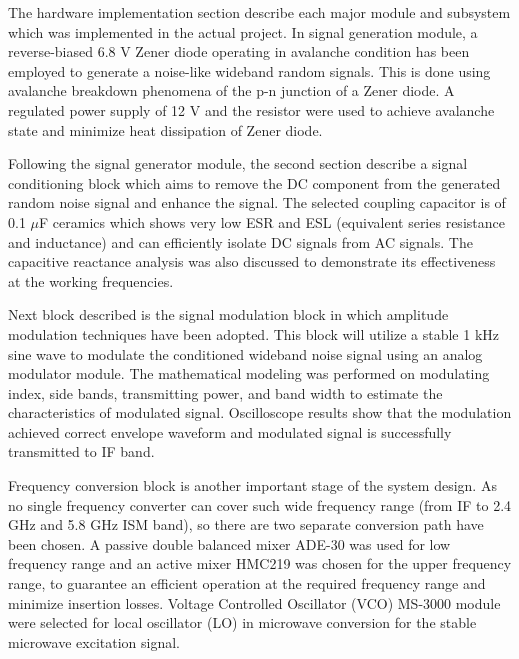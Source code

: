 \documentclass[12pt,a4paper]{report}
\begin{document}
	The hardware implementation section describe each major module and subsystem which was implemented in the actual project. In signal generation module, a reverse-biased 6.8 V Zener diode operating in avalanche condition has been employed to generate a noise-like wideband random signals. This is done using avalanche breakdown phenomena of the p-n junction of a Zener diode. A regulated power supply of 12 V and the resistor were used to achieve avalanche state and minimize heat dissipation of Zener diode.
	
	\vspace{0.5\baselineskip}
	
	Following the signal generator module, the second section describe a signal conditioning block which aims to remove the DC component from the generated random noise signal and enhance the signal. The selected coupling capacitor is of 0.1 $\mu$F ceramics which shows very low ESR and ESL (equivalent series resistance and inductance) and can efficiently isolate DC signals from AC signals. The capacitive reactance analysis was also discussed to demonstrate its effectiveness at the working frequencies.
	
	\vspace{0.5\baselineskip}
	
	Next block described is the signal modulation block in which amplitude modulation techniques have been adopted. This block will utilize a stable 1 kHz sine wave to modulate the conditioned wideband noise signal using an analog modulator module. The mathematical modeling was performed on modulating index, side bands, transmitting power, and band width to estimate the characteristics of modulated signal. Oscilloscope results show that the modulation achieved correct envelope waveform and modulated signal is successfully transmitted to IF band.
	
	\vspace{0.5\baselineskip}
	
	Frequency conversion block is another important stage of the system design. As no single frequency converter can cover such wide frequency range (from IF to 2.4 GHz and 5.8 GHz ISM band), so there are two separate conversion path have been chosen. A passive double balanced mixer ADE-30 was used for low frequency range and an active mixer HMC219 was chosen for the upper frequency range, to guarantee an efficient operation at the required frequency range and minimize insertion losses. Voltage Controlled Oscillator (VCO) MS-3000 module were selected for local oscillator (LO) in microwave conversion for the stable microwave excitation signal.
	
\end{document}
